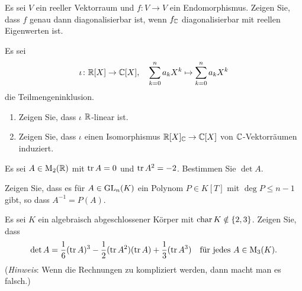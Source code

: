 \documentclass[a4paper,10pt]{scrartcl}
\begin{document}
\begin{question}
  Es sei $V$ ein reeller Vektorraum und $f \colon V \to V$ ein Endomorphismus.
  Zeigen Sie, dass $f$ genau dann diagonalisierbar ist, wenn $f_{\mathbb{C}}$ diagonalisierbar mit reellen Eigenwerten ist.
\end{question}


\begin{question}
  Es sei
  \[
    \iota \colon \mathbb{R}[X] \to \mathbb{C}[X],
    \quad
    \sum_{k=0}^n a_k X^k \mapsto \sum_{k=0}^n a_k X^k
  \]
  die Teilmengeninklusion.
  \begin{enumerate}[leftmargin=*]
    \item
      Zeigen Sie, dass $\iota$ $\mathbb{R}$-linear ist.
    \item
      Zeigen Sie, dass $\iota$ einen Isomorphismus $\mathbb{R}[X]_{\mathbb{C}} \to \mathbb{C}[X]$ von $\mathbb{C}$-Vektorräumen induziert.
  \end{enumerate}
\end{question}













\begin{question}
  Es sei $A \in \operatorname{M}_2(\mathbb{R})$ mit $\operatorname{tr} A = 0$ und $\operatorname{tr} A^2 = -2$.
  Bestimmen Sie $\det A$.
\end{question}


\begin{question}
  Zeigen Sie, dass es für $A \in \operatorname{GL}_n(K)$ ein Polynom $P \in K[T]$ mit $\deg P \leq n-1$ gibt, so dass $A^{-1} = P(A)$.
\end{question}


\begin{question}
  Es sei $K$ ein algebraisch abgeschlossener Körper mit $\operatorname{char} K \notin \{2,3\}$.
  Zeigen Sie, dass
  \[
    \det A = \frac{1}{6} (\operatorname{tr} A)^3 - \frac{1}{2} (\operatorname{tr} A^2)(\operatorname{tr} A) + \frac{1}{3} (\operatorname{tr} A^3)
    \quad
    \text{für jedes $A \in \operatorname{M}_3(K)$}.
  \]
  (\emph{Hinweis}: Wenn die Rechnungen zu kompliziert werden, dann macht man es falsch.)
\end{question}
\end{document}
